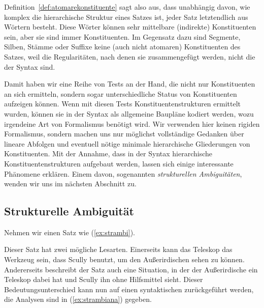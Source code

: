 
Definition~\ref{def:atomarekonstituente} sagt also aus, dass unabhängig davon, wie komplex die hierarchische Struktur eines Satzes ist, jeder Satz letztendlich aus Wörtern besteht.
Diese Wörter können sehr mittelbare (indirekte) Konstituenten sein, aber sie sind immer Konstituenten.
Im Gegensatz dazu sind Segmente, Silben, Stämme oder Suffixe keine (auch nicht atomaren) Konstituenten des Satzes, weil die Regularitäten, nach denen sie zusammengefügt werden, nicht die der Syntax sind.

Damit haben wir eine Reihe von Tests an der Hand, die nicht nur Konstituenten an sich ermitteln, sondern sogar unterschiedliche Status von Konstituenten aufzeigen können.
Wenn mit diesen Tests Konstituentenstrukturen ermittelt wurden, können sie in der Syntax als allgemeine Baupläne kodiert werden, wozu irgendeine Art von Formalismus benötigt wird.
Wir verwenden hier keinen rigiden Formalismus, sondern machen uns nur möglichst vollständige Gedanken über lineare Abfolgen und eventuell nötige minimale hierarchische Gliederungen von Konstituenten.
Mit der Annahme, dass in der Syntax hierarchische Konstituentenstrukturen aufgebaut werden, lassen sich einige interessante Phänomene erklären.
Einem davon, sogenannten \textit{strukturellen Ambiguitäten}, wenden wir uns im nächsten Abschnitt zu.

\subsection{Strukturelle Ambiguität}

Nehmen wir einen Satz wie (\ref{ex:strambi}).

\begin{exe}
\end{exe}

Dieser Satz hat zwei mögliche Lesarten.
Einerseits kann das Teleskop das Werkzeug sein, dass Scully benutzt, um den Außerirdischen sehen zu können.
Andererseits beschreibt der Satz auch eine Situation, in der der Außerirdische ein Teleskop dabei hat und Scully ihn ohne Hilfsmittel sieht.
Dieser Bedeutungsunterschied kann nun auf einen syntaktischen zurückgeführt werden, die Analysen sind in (\ref{ex:strambiana}) gegeben.

